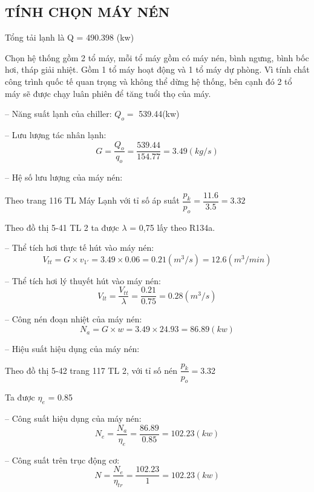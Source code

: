 \subsection{TÍNH CHỌN MÁY NÉN}
Tổng tải lạnh là Q = 490.398 (kw)

Chọn hệ thống gồm 2 tổ máy, mỗi tổ máy gồm có máy nén, bình ngưng, bình bốc hơi, tháp giải nhiệt. Gồm 1 tổ máy hoạt động và 1 tổ máy dự phòng. Vì tính chất công trình quốc tế quan trọng và không thể dừng hệ thống, bên cạnh đó 2 tổ máy sẽ được chạy luân phiên để tăng tuổi thọ của máy.

-- Năng suất lạnh của chiller: $Q_{o} = $ 539.44(kw)

-- Lưu lượng tác nhân lạnh: 
\begin{equation*}
	G = \dfrac{Q_{o}}{q_{o}} = \dfrac{539.44}{154.77} = 3.49 (kg/s)
\end{equation*}

-- Hệ số lưu lượng của máy nén: 

Theo trang 116 TL Máy Lạnh với tỉ số áp suất $\dfrac{p_{k}}{p_{o}} = \dfrac{11.6}{3.5} = 3.32$
	
Theo đồ thị 5-41 TL 2 ta được $\lambda$ = 0,75 lấy theo R134a.


-- Thể tích hơi thực tế hút vào máy nén: 
\begin{equation*}
	V_{tt} = G \times v_{1'} = 3.49 \times 0.06 = 0.21(m^3/s) = 12.6(m^3/min)
\end{equation*}

-- Thể tích hơi lý thuyết hút vào máy nén:
\begin{equation*}
	V_{lt} = \dfrac{V_{tt}}{\lambda} = \dfrac{0.21}{0.75} = 0.28 (m^3/s)
\end{equation*}

-- Công nén đoạn nhiệt của máy nén:
\begin{equation*}
	N_{a} = G\times w = 3.49 \times 24.93 = 86.89 (kw)
\end{equation*}

-- Hiệu suất hiệu dụng của máy nén:

Theo đồ thị 5-42 trang 117 TL 2, với tỉ số nén $ \dfrac{p_{k}}{p_{o}} =  $3.32

Ta được $\eta_{e}$ = 0.85

-- Công suất hiệu dụng của máy nén:
\begin{equation*}
	N_{e} = \dfrac{N_{a}}{\eta_{e}} = \dfrac{86.89}{0.85} = 102.23(kw)
\end{equation*}

-- Công suất trên trục động cơ:
\begin{equation*}
	N = \dfrac{N_{e}}{\eta_{tr}} = \dfrac{102.23}{1} = 102.23(kw)
\end{equation*}

